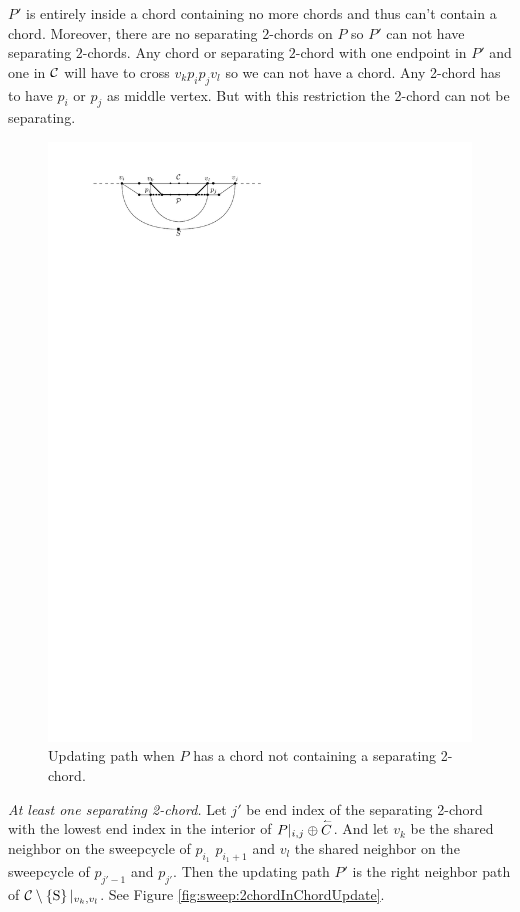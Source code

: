     $P'$ is entirely inside a chord containing no more chords and thus can't contain a chord. Moreover, there are no separating $2$-chords on $P$ so $P'$ can not have separating $2$-chords. Any chord or separating $2$-chord with one endpoint in $P'$ and one in $\mathcal{C}$ will have to cross $v_k p_i p_j v_l$ so we can not have a chord. Any 2-chord has to have $p_i$ or $p_j$ as middle vertex. But with this restriction the 2-chord can not be separating.

    \begin{figure}[h]
      \centering
      \includegraphics[scale=1]{unifiedAlgo/img/sweep/chordUpdate}
      \caption{Updating path when $P$ has a chord not containing a separating 2-chord.}
      \label{fig:sweep:chordUpdate}
    \end{figure}

    \emph{At least one separating 2-chord.}
      Let $j'$ be end index of the separating 2-chord with the lowest end index in the interior of $P|_{i, j} \oplus \accentset{\leftharpoonup}{{C}}$. And let $v_k$ be the shared neighbor on the sweepcycle of $p_{i_1}$ $p_{i_1 +1}$ and $v_l$ the shared neighbor on the sweepcycle  of $p_{j' -1}$ and $p_{j'}$.
      Then the updating path $P'$ is the right neighbor path of $\mathcal{C} \setminus \left\lbrace {\mathrm{S}} \right\rbrace|_{v_k, v_l}$. See Figure \ref{fig:sweep:2chordInChordUpdate}.

